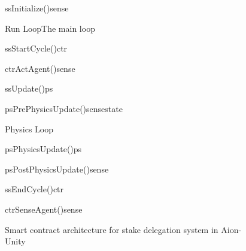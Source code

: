 \begin{figure}[ht]
\centering
\begin {sequencediagram}
  \begin {call}{ss}{Initialize()}{sense}{}
  \end {call}
  \begin {sdblock}{Run Loop}{The main loop}
    \begin {call}{ss}{StartCycle()}{ctr}{}
      \begin {call}{ctr}{ActAgent()}{sense}{}
      \end {call}
    \end {call}
    \begin {call}{ss}{Update()}{ps}{}
      \begin {messcall}{ps}{PrePhysicsUpdate()}{sense}{state}
      \end {messcall}
      \begin {sdblock}{Physics Loop}{}
        \begin {call}{ps}{PhysicsUpdate()}{ps}{}
        \end {call}
      \end {sdblock}
      \begin {call}{ps}{PostPhysicsUpdate()}{sense}{}
      \end {call}
    \end {call}
    \begin {call}{ss}{EndCycle()}{ctr}{}
      \begin {call}{ctr}{SenseAgent()}{sense}{}
      \end {call}
    \end {call}
  \end {sdblock}
\end {sequencediagram}
\caption{Smart contract architecture for stake delegation system in Aion-Unity}
\label{fig:sequence1}
\end{figure}




